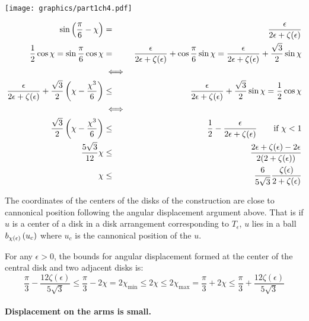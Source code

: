 \begin{minipage}{\linewidth}
\begin{center}
\texttt{[image: graphics/part1ch4.pdf]}
\label{fig:part1ch4.pdf}
\end{center}
\end{minipage}

\begin{eqnarray*}
\sin \left( \frac{\pi}{6} - \chi \right) &=& \frac{\epsilon}{2\epsilon+\zeta(\epsilon)}\\
\frac{1}{2}\cos \chi = \sin \frac{\pi}{6} \cos \chi &=& \frac{\epsilon}{2\epsilon+\zeta(\epsilon)} + \cos \frac{\pi}{6} \sin \chi = \frac{\epsilon}{2\epsilon+\zeta(\epsilon)} +\frac{\sqrt{3}}{2} \sin \chi \\
&\iff&\\
\frac{\epsilon}{2\epsilon+\zeta(\epsilon)} + \frac{\sqrt{3}}{2} \left(  \chi - \frac{\chi^3}{6} \right) &\leq& \frac{\epsilon}{2\epsilon+\zeta(\epsilon)} + \frac{\sqrt{3}}{2} \sin \chi =\frac{1}{2} \cos \chi\\
&\iff&\\
\frac{\sqrt{3}}{2} \left(  \chi - \frac{\chi^3}{6} \right)&\leq& \frac{1}{2}-\frac{\epsilon}{2\epsilon+\zeta(\epsilon)}  \qquad \text{if }\chi < 1 \\
\frac{5\sqrt{3}}{12} \chi &\leq&\frac{2\epsilon + \zeta(\epsilon) - 2\epsilon}{2 ( 2 + \zeta(\epsilon))} \\
\chi &\leq& \frac{6}{5 \sqrt{3}}\frac{\zeta(\epsilon)}{ 2 + \zeta(\epsilon)} 
\end{eqnarray*}

The coordinates of the centers of the disks of the construction are close to cannonical position following the angular displacement argument above.  
That is if $u$ is a center of a disk in a disk arrangement corresponding to $T_\epsilon$, $u$ lies in a ball $b_{\chi(\epsilon)}\left( u_c \right)$ where $u_c$ is the cannonical position of the $u$.  

For any $\epsilon > 0$, the bounds for angular displacement formed at the center of the central disk and two adjacent disks is:
$$ \frac{\pi}{3} - \frac{12 \zeta(\epsilon)}{5\sqrt{3}} \leq \frac{\pi}{3} - 2 \chi = 2\chi_\text{min} \leq 2\chi \leq 2\chi_\text{max} = \frac{\pi}{3} + 2 \chi \leq \frac{\pi}{3} + \frac{12 \zeta(\epsilon)}{5\sqrt{3}}$$
\paragraph{Displacement on the arms is small.}

